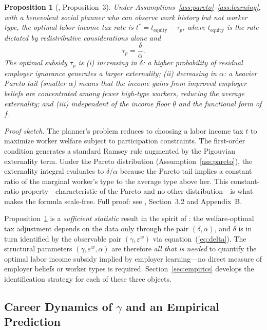 \documentclass[12pt]{article}
\newtheorem{proposition}{Proposition}
\theoremstyle{definition}
\theoremstyle{remark}
\begin{document}
\begin{proposition}[\citealt{sztutman2024}, Proposition~3]
\label{prop:taup}
Under Assumptions~\ref{ass:pareto}--\ref{ass:learning}, with a benevolent social planner
who can observe work history but not worker type, the optimal labor income tax rate is
$t^* = t_{\text{equity}} - \tau_p$, where $t_{\text{equity}}$ is the rate dictated by
redistributive considerations alone and
\[
\tau_p = \frac{\delta}{\alpha}.
\]
The optimal subsidy $\tau_p$ is (i) increasing in $\delta$: a higher probability of residual
employer ignorance generates a larger externality; (ii) decreasing in $\alpha$: a heavier
Pareto tail (smaller $\alpha$) means that the income gains from improved employer beliefs
are concentrated among fewer high-type workers, reducing the average externality; and
(iii) independent of the income floor $\underline{\theta}$ and the functional form of $f$.
\end{proposition}

\noindent \emph{Proof sketch.} The planner's problem reduces to choosing a labor income tax
$t$ to maximize worker welfare subject to participation constraints. The first-order condition
generates a standard Ramsey rule augmented by the Pigouvian externality term. Under the Pareto
distribution (Assumption~\ref{ass:pareto}), the externality integral evaluates to $\delta / \alpha$
because the Pareto tail implies a constant ratio of the marginal worker's type to the average
type above her. This constant-ratio property---characteristic of the Pareto and no other
distribution---is what makes the formula scale-free. Full proof: see \citet{sztutman2024},
Section~3.2 and Appendix~B.

Proposition~\ref{prop:taup} is a \emph{sufficient statistic} result in the spirit of
\citet{chetty2009sufficient}: the welfare-optimal tax adjustment depends on the data only
through the pair $(\delta, \alpha)$, and $\delta$ is in turn identified by the observable
pair $(\gamma, \varepsilon^w)$ via equation~(\ref{eq:delta}). The structural parameters
$(\gamma, \varepsilon^w, \alpha)$ are therefore \emph{all that is needed} to quantify the
optimal labor income subsidy implied by employer learning---no direct measure of employer
beliefs or worker types is required. Section~\ref{sec:empirics} develops the identification
strategy for each of these three objects.

\subsection{Career Dynamics of $\gamma$ and an Empirical Prediction}
\end{document}
